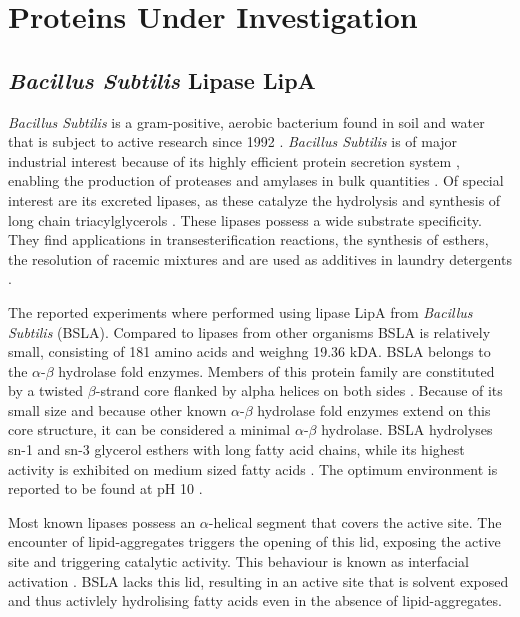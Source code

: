 \documentclass[english, a4paper, 12pt, titlepage, draft]{article}
\begin{document}

\section{Proteins Under Investigation}


\subsection{\textit{Bacillus Subtilis} Lipase LipA}

\textit{Bacillus Subtilis} is a gram-positive, aerobic bacterium found in soil and water that is subject to active research since 1992 \cite{bacillusSubtilis}.
\textit{Bacillus Subtilis} is of major industrial interest because of its highly efficient protein secretion system \cite{BSsecretion}, enabling the production of proteases and amylases in bulk quantities \cite{BSworkhorse}.
Of special interest are its excreted lipases, as these catalyze the hydrolysis and synthesis of long chain triacylglycerols \cite{BSLA_1I6W}.
These lipases possess a wide substrate specificity.
They find applications in transesterification reactions, the synthesis of esthers, the resolution of racemic mixtures and are used as additives in laundry detergents \cite{BSdetergents}.

The reported experiments where performed using lipase LipA from \textit{Bacillus Subtilis} (BSLA).
Compared to lipases from other organisms BSLA is relatively small, consisting of 181 amino acids and weighng 19.36 kDA.
BSLA belongs to the $\alpha$-$\beta$ hydrolase fold enzymes.
Members of this protein family are constituted by a twisted $\beta$-strand core flanked by alpha helices on both sides \cite{alphaBetaHydrolases}.
Because of its small size and because other known $\alpha$-$\beta$ hydrolase fold enzymes extend on this core structure, it can be considered a minimal $\alpha$-$\beta$ hydrolase.
BSLA hydrolyses sn-1 and sn-3 glycerol esthers with long fatty acid chains, while its highest activity is exhibited on medium sized fatty acids \cite{BSLA_1I6W}.
The optimum environment is reported to be found at pH 10 \cite{BSLA_1I6W}.

Most known lipases possess an $\alpha$-helical segment that covers the active site.
The encounter of lipid-aggregates triggers the opening of this lid, exposing the active site and triggering catalytic activity.
This behaviour is known as interfacial activation \cite{alphaBetaHydrolases}.
BSLA lacks this lid, resulting in an active site that is solvent exposed and thus activlely hydrolising fatty acids even in the absence of lipid-aggregates.
\end{document}
